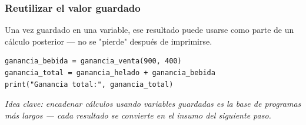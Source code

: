 \documentclass[11pt]{article}
\begin{document}
\subsubsection*{Reutilizar el valor guardado}
Una vez guardado en una variable, ese resultado puede usarse como parte de un cálculo posterior --- no se "pierde" después de imprimirse.

\begin{cajacodigo}
\begin{Verbatim}[fontsize=\small]
ganancia_bebida = ganancia_venta(900, 400)
ganancia_total = ganancia_helado + ganancia_bebida
print("Ganancia total:", ganancia_total)
\end{Verbatim}
\end{cajacodigo}
\textit{Idea clave: encadenar cálculos usando variables guardadas es la base de programas más largos --- cada resultado se convierte en el insumo del siguiente paso.}
\end{document}
